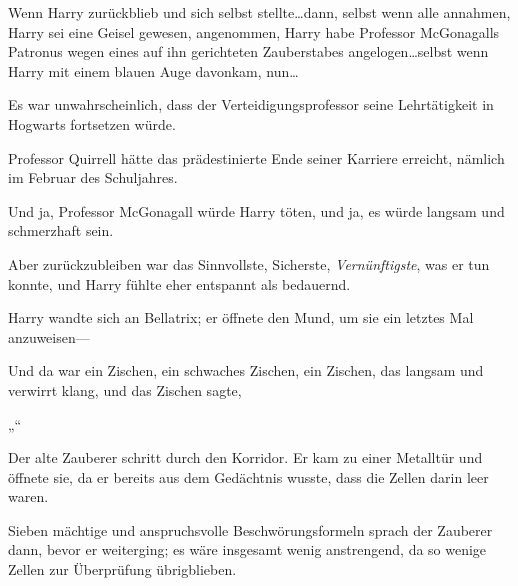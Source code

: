 Wenn Harry zurückblieb und sich selbst stellte…dann, selbst wenn alle annahmen, Harry sei eine Geisel gewesen, angenommen, Harry habe Professor McGonagalls Patronus wegen eines auf ihn gerichteten Zauberstabes angelogen…selbst wenn Harry mit einem blauen Auge davonkam, nun…

Es war unwahrscheinlich, dass der Verteidigungsprofessor seine Lehrtätigkeit in Hogwarts fortsetzen würde.

Professor Quirrell hätte das prädestinierte Ende seiner Karriere erreicht, nämlich im Februar des Schuljahres.

Und ja, Professor McGonagall würde Harry töten, und ja, es würde langsam und schmerzhaft sein.

Aber zurückzubleiben war das Sinnvollste, Sicherste, \emph{Vernünftigste}, was er tun konnte, und Harry fühlte eher entspannt als bedauernd.

Harry wandte sich an Bellatrix; er öffnete den Mund, um sie ein letztes Mal anzuweisen—

Und da war ein Zischen, ein schwaches Zischen, ein Zischen, das langsam und verwirrt klang, und das Zischen sagte,

„“

\later

Der alte Zauberer schritt durch den Korridor. Er kam zu einer Metalltür und öffnete sie, da er bereits aus dem Gedächtnis wusste, dass die Zellen darin leer waren.

Sieben mächtige und anspruchsvolle Beschwörungsformeln sprach der Zauberer dann, bevor er weiterging; es wäre insgesamt wenig anstrengend, da so wenige Zellen zur Überprüfung übrigblieben.

